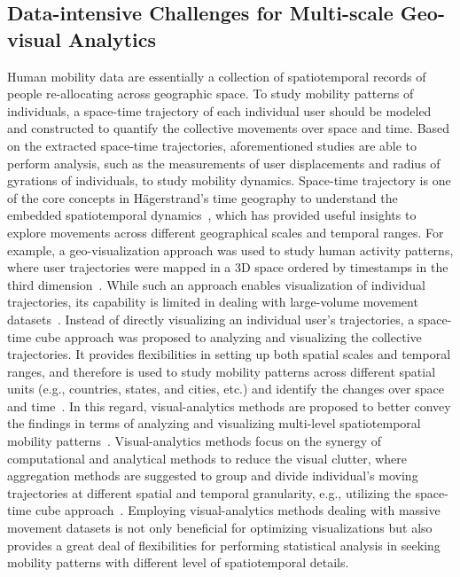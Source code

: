 \documentclass[ijgi,article,accept,moreauthors,pdftex,10pt,a4paper]{mdpi}
\theoremstyle{mdpi}
\newcounter{ex}
\newcounter{re}
\theoremstyle{mdpidefinition}
\begin{document}
\subsection{Data-intensive Challenges for Multi-scale Geo-visual Analytics}
Human mobility data are essentially a collection of spatiotemporal records of people re-allocating across geographic space.
To study mobility patterns of individuals, a space-time trajectory of each individual user should be modeled and constructed to quantify the collective movements over space and time.
Based on the extracted space-time trajectories, aforementioned studies are able to perform analysis, such as the measurements of user displacements and radius of gyrations of individuals, to study mobility dynamics.
Space-time trajectory is one of the core concepts in H{\"a}gerstrand's time geography to understand the embedded spatiotemporal dynamics~\cite{hagerstrand1985time}, which has provided useful insights to explore movements across different geographical scales and temporal ranges.
For example, a geo-visualization approach was used to study human activity patterns, where user trajectories were mapped in a 3D space ordered by timestamps in the third dimension~\cite{kwan2004geovisualization}.
While such an approach enables visualization of individual trajectories, its capability is limited in dealing with large-volume movement datasets~\cite{andrienko2007designing}.
Instead of directly visualizing an individual user's trajectories, a space-time cube approach was proposed to analyzing and visualizing the collective trajectories.
It provides flexibilities in setting up both spatial scales and temporal ranges, and therefore is used to study mobility patterns across different spatial units (e.g., countries, states, and cities, etc.) and identify the changes over space and time~\cite{maceachren2001research, maceachren2004maps}.
In this regard, visual-analytics methods are proposed to better convey the findings in terms of analyzing and visualizing multi-level spatiotemporal mobility patterns~\cite{andrienko2007designing,andrienko2007visual}.
Visual-analytics methods focus on the synergy of computational and analytical methods to reduce the visual clutter, where aggregation methods are suggested to group and divide individual's moving trajectories at different spatial and temporal granularity, e.g., utilizing the space-time cube approach~\cite{andrienko2007designing}.
Employing visual-analytics methods dealing with massive movement datasets is not only beneficial for optimizing visualizations but also provides a great deal of flexibilities for performing statistical analysis in seeking mobility patterns with different level of spatiotemporal details. 
\end{document}
